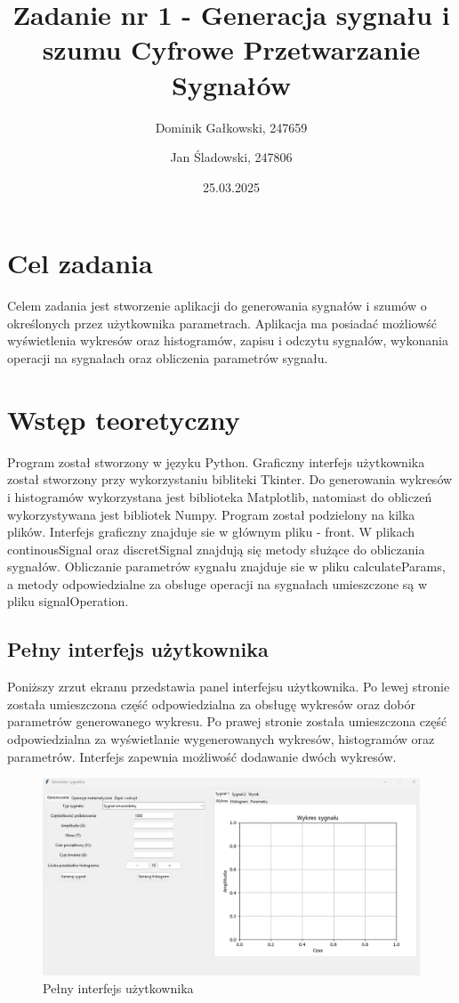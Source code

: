 \documentclass{article}
\title{{\bf Zadanie nr 1 - Generacja sygnału i szumu}\linebreak
Cyfrowe Przetwarzanie Sygnałów}
\author{Dominik Gałkowski, 247659 \and Jan Śladowski, 247806}
\date{25.03.2025}
\begin{document}
\clearpage\maketitle
\thispagestyle{empty}
\newpage
\setcounter{page}{1}
\section{Cel zadania}

Celem zadania jest stworzenie aplikacji do generowania sygnałów i szumów o określonych
przez użytkownika parametrach. Aplikacja ma posiadać możliowść wyświetlenia wykresów oraz histogramów,
zapisu i odczytu sygnałów, wykonania operacji na sygnałach oraz obliczenia parametrów sygnału.

\section{Wstęp teoretyczny}

Program został stworzony w języku Python. Graficzny interfejs użytkownika został stworzony
przy wykorzystaniu bibliteki Tkinter. Do generowania wykresów i histogramów wykorzystana jest biblioteka Matplotlib,
natomiast do obliczeń wykorzystywana jest bibliotek Numpy. Program został podzielony na kilka plików.
Interfejs graficzny znajduje sie w głównym pliku - front. W plikach continousSignal oraz discretSignal znajdują się
metody służące do obliczania sygnałów. Obliczanie parametrów sygnału znajduje sie w pliku calculateParams, a
metody odpowiedzialne za obsługe operacji na sygnałach umieszczone są w pliku signalOperation.

\subsection{Pełny interfejs użytkownika} 




Poniższy zrzut ekranu przedstawia panel interfejsu użytkownika. Po lewej stronie
            została umieszczona część odpowiedzialna za obsługę wykresów oraz dobór parametrów
            generowanego wykresu. Po prawej stronie została umieszczona część odpowiedzialna za
            wyświetlanie wygenerowanych wykresów, histogramów oraz parametrów. Interfejs zapewnia
            możliwość dodawanie dwóch wykresów.
\FloatBarrier
\begin{figure}[h!]
    \centering
    \includegraphics[width=\textwidth]{img/glowny.png}
    \caption{Pełny interfejs użytkownika}
\end{figure}
\end{document}
